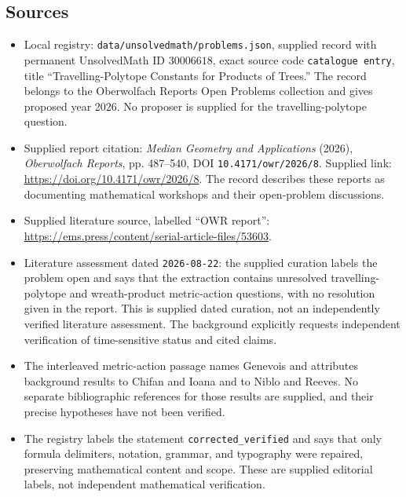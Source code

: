 \documentclass[11pt]{article}
\begin{document}
\subsection{Sources}
\begin{itemize}
\item Local registry: \texttt{data/unsolvedmath/problems.json}, supplied record with permanent UnsolvedMath ID \(30006618\), exact source code \texttt{catalogue entry}, title ``Travelling-Polytope Constants for Products of Trees.'' The record belongs to the Oberwolfach Reports Open Problems collection and gives proposed year 2026. No proposer is supplied for the travelling-polytope question.
\item Supplied report citation: \emph{Median Geometry and Applications} (2026), \emph{Oberwolfach Reports}, pp. 487--540, DOI \texttt{10.4171/owr/2026/8}. Supplied link: \url{https://doi.org/10.4171/owr/2026/8}. The record describes these reports as documenting mathematical workshops and their open-problem discussions.
\item Supplied literature source, labelled ``OWR report'': \url{https://ems.press/content/serial-article-files/53603}.
\item Literature assessment dated \texttt{2026-08-22}: the supplied curation labels the problem open and says that the extraction contains unresolved travelling-polytope and wreath-product metric-action questions, with no resolution given in the report. This is supplied dated curation, not an independently verified literature assessment. The background explicitly requests independent verification of time-sensitive status and cited claims.
\item The interleaved metric-action passage names Genevois and attributes background results to Chifan and Ioana and to Niblo and Reeves. No separate bibliographic references for those results are supplied, and their precise hypotheses have not been verified.
\item The registry labels the statement \texttt{corrected\_verified} and says that only formula delimiters, notation, grammar, and typography were repaired, preserving mathematical content and scope. These are supplied editorial labels, not independent mathematical verification.
\end{itemize}
\end{document}
